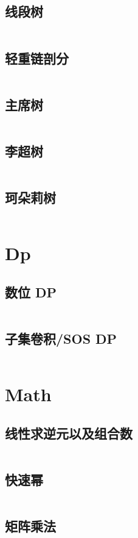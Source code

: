 \documentclass[titlepage, a4paper]{article}
\begin{document}
\begin{multicols}{2}
\begin{spacing}{0.6}
			 	\subsection{线段树}
			 		\inputminted{cpp}{src/Ds/Segment_tree.cpp}
			 	\subsection{轻重链剖分}
			 		\inputminted{cpp}{src/Ds/Hld.cpp}
			 	\subsection{主席树}
			 		\inputminted{cpp}{src/Ds/Persistent_seg.cpp}
			 	\subsection{李超树}
			 		\inputminted{cpp}{src/Ds/Li_chao_tree.cpp}
			 	\subsection{珂朵莉树}
			 		\inputminted{cpp}{src/Ds/Odt.cpp}
			 \section{Dp}
			 	\subsection{数位 DP}
			 		\inputminted{python}{src/Dp/Dight_dp.py}
			 	\subsection{子集卷积/SOS DP}
			 		\inputminted{cpp}{src/Dp/Sos_dp.cpp}
			 \section{Math}
			 	\subsection{线性求逆元以及组合数}
			 		\inputminted{cpp}{src/Math/Comb_inv.cpp}
			 	\subsection{快速幂}
			 		\inputminted{cpp}{src/Math/Qpow.cpp}
			 	\subsection{矩阵乘法}
			 		\inputminted{cpp}{src/Math/Matrix_mul.cpp}

\end{spacing}
\end{multicols}
\end{document}
